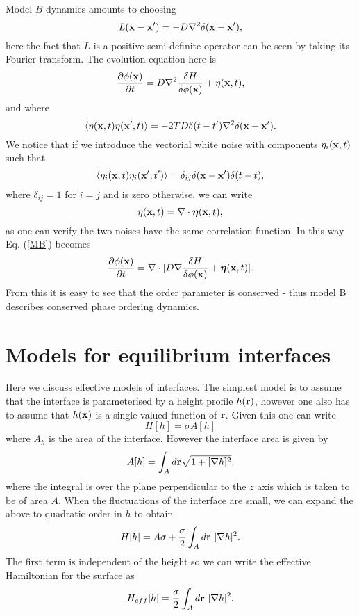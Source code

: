 \documentclass[11pt]{report}
\begin{document}
Model $B$ dynamics amounts to choosing
\begin{equation}
L({\bf x}-{\bf x}')= -D\nabla^2 \delta({\bf x}-{\bf x'}),
\end{equation}
here the fact that $L$ is a positive semi-definite operator can be seen by taking its Fourier transform. The evolution equation here is
\begin{equation}
\frac{\partial \phi({\bf x})}{\partial t}= D\nabla^2 \frac{\delta H}{\delta \phi({\bf x})} + \eta({\bf x},t),
\label{MB}
\end{equation}
and where
\begin{equation}
\langle \eta({\bf x},t)\eta({\bf x}',t)\rangle =-2TD   \delta(t-t')\nabla^2\delta({\bf x}-{\bf x'}).
\end{equation}
We notice that if we introduce the vectorial white noise with components $\eta_i({\bf x},t)$ such that
\begin{equation}
\langle \eta_i({\bf x},t) \eta_i({\bf x}',t')\rangle =\delta_{ij} \delta({\bf x}-{\bf x'})\delta(t-t),
\end{equation}
where $\delta_{ij}=1$ for $i=j$ and is zero otherwise,  we can write
\begin{equation}
\eta({\bf x},t)= \nabla\cdot {\boldsymbol \eta}({\bf x},t),
\end{equation}
as one can verify the two noises have the same correlation function. In this way Eq. (\ref{MB}) becomes 
\begin{equation}
\frac{\partial \phi({\bf x})}{\partial t}= \nabla\cdot[ D\nabla \frac{\delta H}{\delta \phi({\bf x})} + {\boldsymbol\eta}({\bf x},t)].
\end{equation}
From this it is easy to see that the order parameter is conserved - thus model  B describes conserved phase ordering dynamics.

\section{Models for equilibrium interfaces}
Here we discuss effective models of interfaces. The simplest model is to assume that the 
interface is parameterised by a height profile $h({\bf r})$, however one also has to assume that 
$h({\bf x})$ is a single valued function of ${\bf r}$. Given this one can write
\begin{equation}
H[h] = \sigma A[h]
\end{equation}
where $A_h$ is the area of the interface. However the interface area is given by
\begin{equation}
A[h] = \int_A d{\bf r}\sqrt{1+[\nabla h]^2},
\end{equation}
where the integral is over the plane perpendicular to the $z$ axis which is taken to be of area $A$. When the fluctuations of the interface are small, we can expand the above to quadratic order in $h$ to obtain
\begin{equation}
H[h]= A\sigma +\frac{\sigma}{2} \int_A d{\bf r} \ [\nabla h]^2.
\end{equation}
The first term is independent of the height so we can write the effective Hamiltonian for the surface as
\begin{equation}
H_{eff} [h]= \frac{\sigma}{2} \int_A d{\bf r}\  [\nabla h]^2.\label{heff}
\end{equation}
\end{document}
